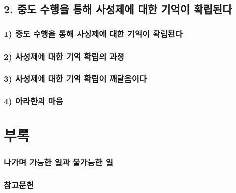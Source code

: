 \documentclass[12pt, a4paper, oneside]{book}
\begin{document}
	\newpage
	\chapter{2. 중도 수행을 통해 사성제에 대한 기억이 확립된다}
	\section{1) 중도 수행을 통해 사성제에 대한 기억이 확립된다}
	\section{2) 사성제에 대한 기억 확립의 과정}
	\section{3) 사성제에 대한 기억 확립이 깨달음이다}
	\section{4) 아라한의 마음}

	\part{부록}	

	\section{나가며  가능한 일과 불가능한 일}
	\section{참고문헌}



\end{document}
